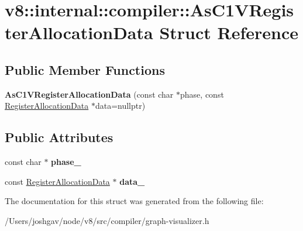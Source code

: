 \hypertarget{structv8_1_1internal_1_1compiler_1_1_as_c1_v_register_allocation_data}{}\section{v8\+:\+:internal\+:\+:compiler\+:\+:As\+C1\+V\+Register\+Allocation\+Data Struct Reference}
\label{structv8_1_1internal_1_1compiler_1_1_as_c1_v_register_allocation_data}
\subsection*{Public Member Functions}
\begin{DoxyCompactItemize}
\item 
{\bfseries As\+C1\+V\+Register\+Allocation\+Data} (const char $\ast$phase, const \hyperlink{classv8_1_1internal_1_1compiler_1_1_register_allocation_data}{Register\+Allocation\+Data} $\ast$data=nullptr)\hypertarget{structv8_1_1internal_1_1compiler_1_1_as_c1_v_register_allocation_data_ae9442047711e720756b551818a66b533}{}\label{structv8_1_1internal_1_1compiler_1_1_as_c1_v_register_allocation_data_ae9442047711e720756b551818a66b533}

\end{DoxyCompactItemize}
\subsection*{Public Attributes}
\begin{DoxyCompactItemize}
\item 
const char $\ast$ {\bfseries phase\+\_\+}\hypertarget{structv8_1_1internal_1_1compiler_1_1_as_c1_v_register_allocation_data_a179a0b3dc98004412380d53663ba1290}{}\label{structv8_1_1internal_1_1compiler_1_1_as_c1_v_register_allocation_data_a179a0b3dc98004412380d53663ba1290}

\item 
const \hyperlink{classv8_1_1internal_1_1compiler_1_1_register_allocation_data}{Register\+Allocation\+Data} $\ast$ {\bfseries data\+\_\+}\hypertarget{structv8_1_1internal_1_1compiler_1_1_as_c1_v_register_allocation_data_a281a39025bf7a8c1dfb6f4f74995df1d}{}\label{structv8_1_1internal_1_1compiler_1_1_as_c1_v_register_allocation_data_a281a39025bf7a8c1dfb6f4f74995df1d}

\end{DoxyCompactItemize}


The documentation for this struct was generated from the following file\+:\begin{DoxyCompactItemize}
\item 
/\+Users/joshgav/node/v8/src/compiler/graph-\/visualizer.\+h\end{DoxyCompactItemize}
